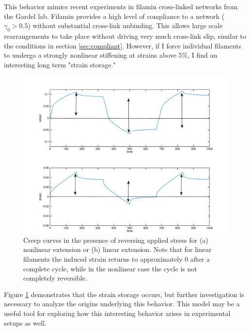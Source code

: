 This behavior mimics recent experiments in filamin cross-linked networks from the Gardel lab.  Filamin provides a high level of compliance to a network ($\gamma_0>0.5$) without substantial cross-link unbinding.  This allows large scale rearrangements to take place without driving very much cross-link slip, similar to the conditions in section \ref{sec:compliant}.  However, if I force individual filaments to undergo a strongly nonlinear stiffening at strains above 5\%, I find an interesting long term "strain storage."

\begin{figure}[h!]
\centering
\includegraphics[width=\hsize]{slippage/strain_mem_weak}
\caption[Creep curves in the presence of reversing applied stress.]{\label{fig:strain_mem_weak} Creep curves in the presence of reversing applied stress for (a) nonlinear extension or (b) linear extension.  Note that for linear filaments the induced strain returns to approximately 0 after a complete cycle, while in the nonlinear case the cycle is not completely reversible.}
\end{figure}

Figure \ref{fig:strain_mem_weak} demonstrates that the strain storage occurs, but further investigation is necessary to analyze the origins underlying this behavior.  This model may be a useful tool for exploring how this interesting behavior arises in experimental setups as well.













